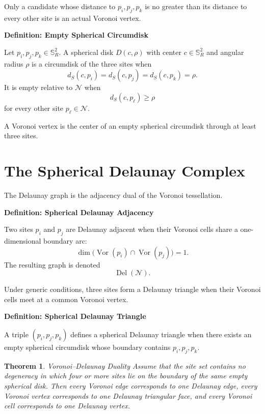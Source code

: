 \documentclass[11pt,fleqn]{book}
\numberwithin{equation}{chapter}
\newenvironment{definition}[1]
  {\begin{definitionEnv}
   \noindent\textbf{Definition: #1}\par\smallskip}
  {\end{definitionEnv}}
\theoremstyle{plain}
\newtheorem{theorem}{Theorem}[chapter]
\theoremstyle{definition}
\theoremstyle{remark}
\newcommand{\Sphere}{\mathbb{S}^{2}}
\newcommand{\Nset}{\mathcal{N}}
\newcommand{\Vor}{\operatorname{Vor}}
\newcommand{\Del}{\operatorname{Del}}
\begin{document}
Only a candidate whose distance to \(p_i,p_j,p_k\) is no greater than its distance to every other site is an actual Voronoi vertex.

\begin{definition}{Empty Spherical Circumdisk}
Let \(p_i,p_j,p_k\in\Sphere_R\). A spherical disk \(D(c,\rho)\) with center \(c\in\Sphere_R\) and angular radius \(\rho\) is a circumdisk of the three sites when
\[
d_S(c,p_i)
=
d_S(c,p_j)
=
d_S(c,p_k)
=
\rho.
\]
It is empty relative to \(\Nset\) when
\[
d_S(c,p_\ell)\geq \rho
\]
for every other site \(p_\ell\in\Nset\).
\end{definition}

A Voronoi vertex is the center of an empty spherical circumdisk through at least three sites.

\section{The Spherical Delaunay Complex}

The Delaunay graph is the adjacency dual of the Voronoi tessellation.

\begin{definition}{Spherical Delaunay Adjacency}
Two sites \(p_i\) and \(p_j\) are Delaunay adjacent when their Voronoi cells share a one-dimensional boundary arc:
\[
\dim\bigl(
\Vor(p_i)\cap\Vor(p_j)
\bigr)=1.
\]
The resulting graph is denoted
\[
\Del(\Nset).
\]
\end{definition}

Under generic conditions, three sites form a Delaunay triangle when their Voronoi cells meet at a common Voronoi vertex.

\begin{definition}{Spherical Delaunay Triangle}
A triple \((p_i,p_j,p_k)\) defines a spherical Delaunay triangle when there exists an empty spherical circumdisk whose boundary contains \(p_i,p_j,p_k\).
\end{definition}

\begin{theorem}{Voronoi--Delaunay Duality}
Assume that the site set contains no degeneracy in which four or more sites lie on the boundary of the same empty spherical disk. Then every Voronoi edge corresponds to one Delaunay edge, every Voronoi vertex corresponds to one Delaunay triangular face, and every Voronoi cell corresponds to one Delaunay vertex.
\end{theorem}
\end{document}
